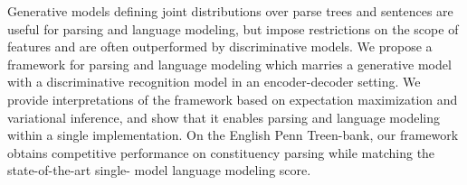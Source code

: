 Generative models defining joint distributions over parse trees and sentences are useful for parsing and language modeling, but impose restrictions on the scope of features and are often outperformed by discriminative models. We propose a framework for parsing and language modeling which marries a generative model with a discriminative recognition model in an encoder-decoder setting. We provide interpretations of the framework based on expectation maximization and variational inference, and show that it enables parsing and language modeling within a single implementation. On the English Penn Treen-bank, our framework obtains competitive performance on constituency parsing while matching the state-of-the-art single- model language modeling score.
